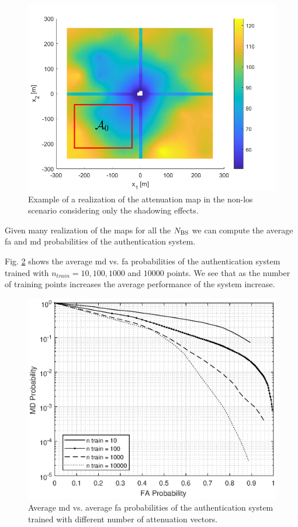\documentclass[twocolumns]{IEEEtran}
\begin{document}
\begin{figure}[t]
    \centering
    \includegraphics[width=1\columnwidth]{surfColorato.png}
    \caption{Example of a realization of the attenuation map in the non-\ac{los} scenario considering only the shadowing effects.}
    \label{fig:trueMap}
\end{figure}

Given many realization of the maps for all the $N_{\rm BS}$ we can compute the average \ac{fa} and \ac{md} probabilities of the authentication system.

Fig. \ref{fig:n_train} shows the average \ac{md} vs. \ac{fa} probabilities of the authentication system trained with $n_{train} = 10, 100, 1000$ and $10000$ points. We see that as the number of training points increases the average performance of the system increase.

\begin{figure}[t]
    \centering
    \includegraphics[width=1\columnwidth]{mean_maps.eps}
    \caption{Average \ac{md} vs. average \ac{fa} probabilities of the authentication system trained with different number of attenuation vectors.}
    \label{fig:n_train}
\end{figure}
\end{document}
